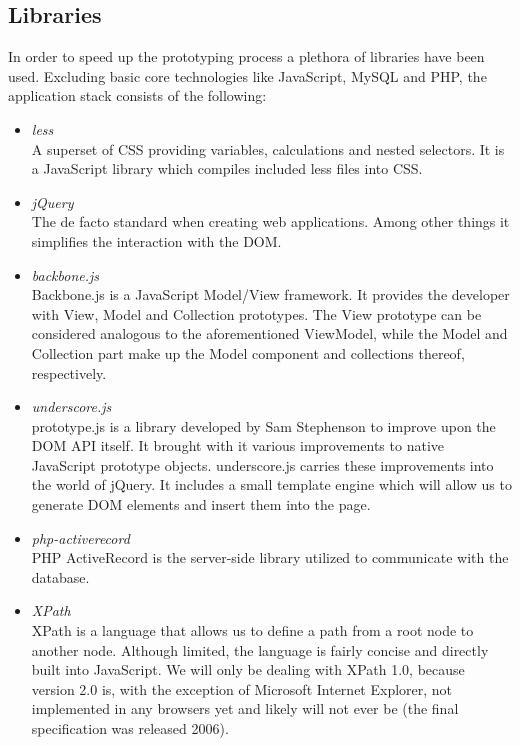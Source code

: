 \documentclass[thesis.tex]{subfiles}
\begin{document}
\subsection{Libraries}
In order to speed up the prototyping process a plethora of libraries have been
used. Excluding basic core technologies like JavaScript, MySQL and PHP, the
application stack consists of the following:
\begin{itemize}
	\item \emph{less}\\
		A superset of CSS providing variables, calculations and nested selectors. It
		is a JavaScript library which compiles included less files into CSS.
	\item \emph{jQuery}\\
		The de facto standard when creating web applications. Among other things it
		simplifies the interaction with the DOM.
	\item \emph{backbone.js}\label{sec:backbonejs}\\
		Backbone.js is a JavaScript Model/View framework. It provides the developer
		with View, Model and Collection prototypes. The View prototype can be
		considered analogous to the aforementioned ViewModel, while the Model and
		Collection part make up the Model component and collections thereof,
		respectively.
	\item \emph{underscore.js}\\
		prototype.js is a library developed by Sam Stephenson to improve upon the
		DOM API itself.
		It brought with it various improvements to native JavaScript prototype
		objects.
		underscore.js carries these improvements into the world of jQuery.
		It includes a small template engine which will allow us to generate
		DOM elements and insert them into the page.
	\item \emph{php-activerecord}\\
		PHP ActiveRecord is the server-side library utilized to communicate with the
		database.
	\item \emph{XPath}\\
		XPath is a language that allows us to define a path from a root node to
		another node.
		Although limited, the language is fairly concise and directly built into
		JavaScript. We will only be dealing with XPath 1.0, because version 2.0 is,
		with the exception of Microsoft Internet Explorer, not implemented in any
		browsers yet and likely will not ever be (the final specification was
		released 2006).
\end{itemize}
\end{document}
